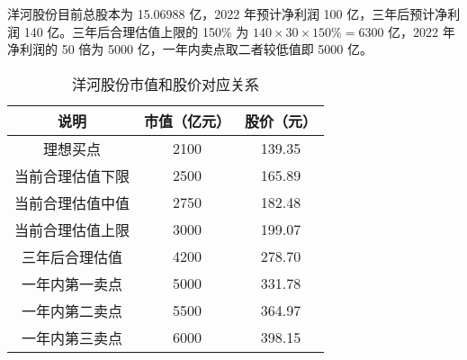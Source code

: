 \documentclass[12pt, a4paper, UTF8, fontset=adobe, oneside]{ctexbook} %
\begin{document}
\newpage
洋河股份目前总股本为 15.06988 亿，2022 年预计净利润 100 亿，三年后预计净利润 140
亿。三年后合理估值上限的 150\% 为 $140 \times 30 \times 150\% = 6300$ 亿，2022 年
净利润的 50 倍为 5000 亿，一年内卖点取二者较低值即 5000 亿。

\begin{table}[htbp]
  \caption{洋河股份市值和股价对应关系}
  \begin{center}
  \begin{tabular}{ccc}
    \toprule
    说明 & 市值（亿元）& 股价（元）  \\
    \midrule
    理想买点 & 2100 & 139.35  \\
    当前合理估值下限 & 2500 & 165.89  \\
    当前合理估值中值 & 2750 & 182.48  \\
    当前合理估值上限 & 3000 & 199.07  \\
    三年后合理估值 & 4200 & 278.70  \\
    一年内第一卖点 & 5000 & 331.78  \\
    一年内第二卖点 & 5500 & 364.97  \\
    一年内第三卖点 & 6000 & 398.15  \\
    \bottomrule
  \end{tabular}
\end{center}
\end{table}



\end{document}
